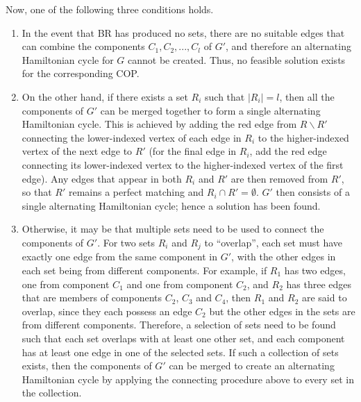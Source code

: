 \documentclass[runningheads]{llncs}
\begin{document}
Now, one of the following three conditions holds.
\begin{enumerate}
\item In the event that BR has produced no sets, there are no suitable edges that can combine the components $C_1, C_2, ..., C_l$ of $G'$, and therefore an alternating Hamiltonian cycle for $G$ cannot be created. Thus, no feasible solution exists for the corresponding COP.

\item On the other hand, if there exists a set $R_i$ such that $|R_i| = l$, then all the components of $G'$ can be merged together to form a single alternating Hamiltonian cycle. This is achieved by adding the red edge from $R\backslash R'$ connecting the lower-indexed vertex of each edge in $R_i$ to the higher-indexed vertex of the next edge to $R'$ (for the final edge in $R_i$, add the red edge connecting its lower-indexed vertex to the higher-indexed vertex of the first edge). Any edges that appear in both $R_i$ and $R'$ are then removed from $R'$, so that $R'$ remains a perfect matching and $R_i \cap R' = \emptyset$. $G'$ then consists of a single alternating Hamiltonian cycle; hence a solution has been found.

\item Otherwise, it may be that multiple sets need to be used to connect the components of $G'$. For two sets $R_i$ and $R_j$ to ``overlap'', each set must have exactly one edge from the same component in $G'$, with the other edges in each set being from different components. For example, if $R_1$ has two edges, one from component $C_1$ and one from component $C_2$, and $R_2$ has three edges that are members of components $C_2$, $C_3$ and $C_4$, then $R_1$ and $R_2$ are said to overlap, since they each possess an edge $C_2$ but the other edges in the sets are from different components. Therefore, a selection of sets need to be found such that each set overlaps with at least one other set, and each component has at least one edge in one of the selected sets. If such a collection of sets exists, then the components of $G'$ can be merged to create an alternating Hamiltonian cycle by applying the connecting procedure above to every set in the collection.
\end{enumerate}
\end{document}
